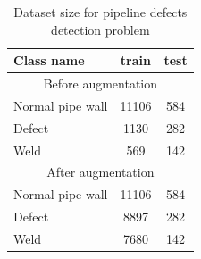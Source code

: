 \begin{table}[!htb]
	\caption{\label{tab:alg1}Dataset size for pipeline defects detection problem}
	\begin{center}
		\small
		\begin{tabular}{| l | c | c |}
			\hline
			Class name & train & test \\
			\hline
			\multicolumn{3}{|c|}{Before augmentation}  \\
			\hline
			Normal pipe wall  & 11106 & 584 \\
			Defect & 1130 & 282 \\
			Weld & 569 & 142 \\
			\hline
			\multicolumn{3}{|c|}{After augmentation}  \\
			\hline
			Normal pipe wall & 11106 & 584 \\
			Defect & 8897 & 282 \\
			Weld & 7680 & 142 \\
			\hline
		\end{tabular}
	\end{center}
\end{table}

